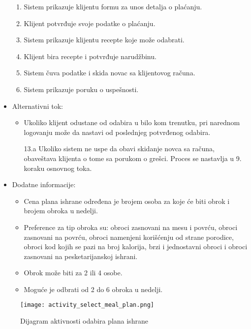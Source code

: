 \begin{itemize}
\begin{enumerate}
            \item Sistem prikazuje klijentu formu za unos detalja o plaćanju.
            \item Klijent potvrđuje svoje podatke o plaćanju.
            \item Sistem prikazuje klijentu recepte koje može odabrati.
            \item Klijent bira recepte i potvrđuje narudžbinu.
            \item Sistem čuva podatke i skida novac sa klijentovog računa.
            \item Sistem prikazuje poruku o uspešnosti. 
        \end{enumerate}
    \item Alternativni tok:
        \begin{itemize}
            \item Ukoliko klijent odustane od odabira u bilo kom trenutku, pri narednom logovanju može da nastavi od poslednjeg potvrđenog odabira.
            \item[13.a] Ukoliko sistem ne uspe da obavi skidanje novca sa računa, obaveštava klijenta o tome sa porukom o grešci. Proces se nastavlja u 9. koraku osnovnog toka.
        \end{itemize}
    \item Dodatne informacije:
        \begin{itemize}
            \item Cena plana ishrane određena je brojem osoba za koje će biti obrok i brojem obroka u nedelji.
            \item Preference za tip obroka su: obroci zasnovani na mesu i povrću, obroci zasnovani na povrću, obroci namenjeni korišćenju od strane porodice, obroci kod kojih se pazi na broj kalorija, brzi i jednostavni obroci i obroci zasnovani na pesketarijanskoj ishrani. 
            \item Obrok može biti za 2 ili 4 osobe.
            \item Moguće je odbrati od 2 do 6 obroka u nedelji.
        \end{itemize}
\end{itemize}

\begin{figure}[H]
\begin{center}
\texttt{[image: activity\_select\_meal\_plan.png]}
\end{center}
    \caption{Dijagram aktivnosti odabira plana ishrane}
\label{fig:ActivitySelectMealPlan}
\end{figure}
